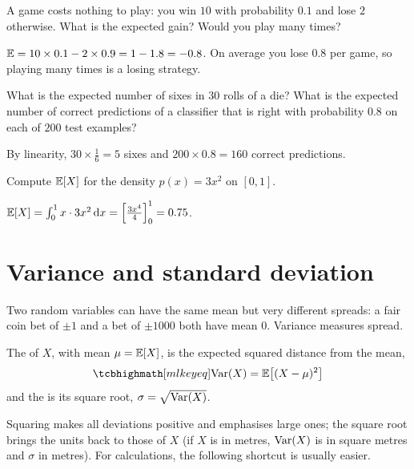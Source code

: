 \begin{exercise}
A game costs nothing to play: you win $10$ with probability $0.1$ and lose $2$
otherwise. What is the expected gain? Would you play many times?
\end{exercise}
\begin{solution}
$\mathbb{E} = 10\times0.1 - 2\times0.9 = 1 - 1.8 = -0.8$. On average you lose $0.8$ per
game, so playing many times is a losing strategy.
\end{solution}

\begin{exercise}
What is the expected number of sixes in $30$ rolls of a die? What is the expected
number of correct predictions of a classifier that is right with probability
$0.8$ on each of $200$ test examples?
\end{exercise}
\begin{solution}
By linearity, $30\times\tfrac16 = 5$ sixes and $200\times0.8 = 160$ correct
predictions.
\end{solution}

\begin{exercise}
Compute $\mathbb{E}[X]$ for the density $p(x) = 3x^2$ on $[0, 1]$.
\end{exercise}
\begin{solution}
$\mathbb{E}[X] = \int_0^1 x\cdot3x^2\,\mathrm{d} x = \left[\tfrac{3x^4}{4}\right]_0^1 = 0.75$.
\end{solution}

\section{Variance and standard deviation}\label{sec:variance}

Two random variables can have the same mean but very different spreads: a fair
coin bet of $\pm1$ and a bet of $\pm1000$ both have mean $0$. Variance measures
spread.

\begin{definition}\label{def:variance}
The  of $X$, with mean $\mu = \mathbb{E}[X]$, is the expected squared
distance from the mean,
\[
  \keyeq{\Var(X) = \E\bigl[(X - \mu)^2\bigr]}
\]
and the  is its square root, $\sigma = \sqrt{\operatorname{Var}(X)}$.
\end{definition}

Squaring makes all deviations positive and emphasises large ones; the square root
brings the units back to those of $X$ (if $X$ is in metres, $\operatorname{Var}(X)$ is in square
metres and $\sigma$ in metres). For calculations, the following shortcut is
usually easier.


